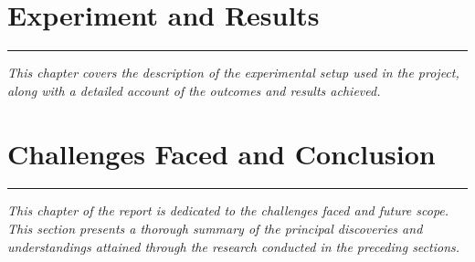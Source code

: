 \documentclass[12pt,phd,times]{pkmthesis}
\begin{document}
\chapter{Experiment and Results}
\vspace{-1cm}
\noindent \rule{6.6in}{0.01in}
\emph{This chapter covers the description of the experimental setup used in the project, along with a detailed account of the outcomes and results achieved.}
\label{chap:results}


\chapter{Challenges Faced and Conclusion}
\vspace{-1cm}
\noindent \rule{6.6in}{0.01in}
\emph{This chapter of the report is dedicated to the challenges faced and future scope. This section presents a thorough summary of the principal discoveries and understandings attained through the research conducted in the preceding sections.}
\label{chap:conclusion and future scopes}

\baselineskip 11pt
\small
\nocite{*}

\let\oldclearpage\clearpage
\let\clearpage\relax
\let\cleardoublepage\relax

\let\clearpage\oldclearpage

\end{document}
